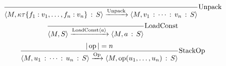 \documentclass{article}
\newcommand{\colons}{\,:\,}
\newcommand{\tmop}[1]{\ensuremath{\operatorname{#1}}}
\newcommand{\tmstrong}[1]{\textbf{#1}}
\begin{document}
\[ \frac{}{\langle M, \kappa \tau \{ f_1 : v_1, \ldots, f_n : v_n \} \colons S
   \rangle \xrightarrow{\tmop{Unpack}} \langle M, v_1 \colons \cdots \colons
   v_n \colons S \rangle}  \tmstrong{\tmop{Unpack}} \]
\[ \frac{}{\langle M, S \rangle \xrightarrow{\tmop{LoadConst} \langle a
   \rangle} \langle M, a \colons S \rangle}  \tmstrong{\tmop{LoadConst}} \]
\[ \frac{| \tmop{op} | = n}{\langle M, u_1 \colons \cdots \colons u_n \colons
   S \rangle \xrightarrow{\tmop{Op}} \langle M, \tmop{op} (u_1, \ldots, u_n)
   \colons S \rangle}  \tmstrong{\tmop{StackOp}} \]
\end{document}
